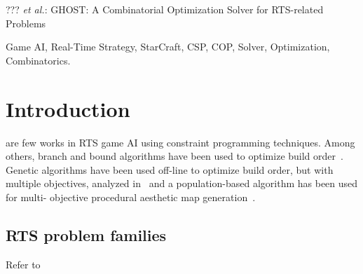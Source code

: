 \documentclass[journal]{IEEEtran}
\newcommand{\ghost}{\textsc{GHOST}\xspace}
\begin{document}
%
{??? \MakeLowercase{\textit{et al.}}: \ghost: A Combinatorial Optimization Solver for RTS-related Problems}

\maketitle

\begin{abstract}
This paper  presents \ghost, a combinatorial  optimization solver that
an RTS AI developer can use as a blackbox to solve any problem encoded
into a  constraint satisfaction/optimization  problem. We  have tested
our solver on  three very different problems, each one  belonging to a
specific level of  abstraction. One the three, \ghost  shows very good
results computed within some tens of milliseconds.
\end{abstract}

\begin{IEEEkeywords}
Game   AI,   Real-Time   Strategy,  StarCraft,   CSP,   COP,   Solver,
Optimization, Combinatorics.
\end{IEEEkeywords}

%
\IEEEpeerreviewmaketitle

\section{Introduction}\label{sec:intro}
 are few works  in RTS game AI using constraint
programming  techniques.  Among  others, branch  and bound  algorithms
have been  used to optimize build  order~\cite{ChurchillB11}.  Genetic
algorithms have been  used off-line to optimize build  order, but with
multiple    objectives,    analyzed   in~\cite{KuchemPR13}    and    a
population-based  algorithm   has  been  used  for   multi-  objective
procedural aesthetic map generation~\cite{LaraCF14}.

\subsection{RTS problem families}
Refer to \cite{OntanonSURCM13}
\end{document}
